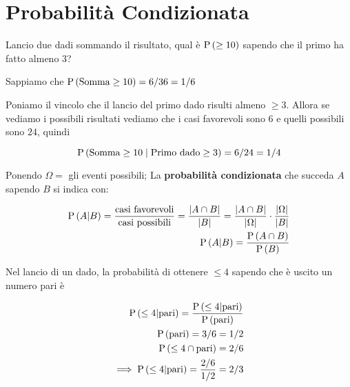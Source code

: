 \section{Probabilit\`a Condizionata}

\begin{exmp}
    Lancio due dadi sommando il risultato, qual \`e $ \text{P}\left(\geq 10\right) $ sapendo che il primo ha fatto almeno 3?

    Sappiamo che $ \text{P}\left(\text{Somma} \geq 10\right) = 6/36 = 1/6 $
    
	Poniamo il vincolo che il lancio del primo dado risulti almeno $ \geq 3 $. Allora se vediamo i possibili
    risultati vediamo che i casi favorevoli sono $6$ e quelli possibili sono $24$, quindi

    \begin{equation*}
    \text{P}\left(\text{Somma} \geq 10 \mid \text{Primo dado} \geq 3\right) = 6/24 = 1/4
    \end{equation*}
\end{exmp}



\begin{defn}
    
    Ponendo $ \Omega = $ gli eventi possibili;
    La \textbf{probabilit\`a condizionata} che succeda $ A $ sapendo $ B $ si indica con:
    
    \begin{equation}
    \begin{aligned}
    \text{P}\left(A|B\right) = \dfrac{\text{casi favorevoli}}{\text{casi possibili}} = \dfrac{\lvert A \cap B\rvert}{\lvert B\rvert} = \dfrac{\lvert A \cap B\rvert}{\lvert\Omega\rvert} \cdot \dfrac{\lvert\Omega\rvert}{\lvert B\rvert} \\
    \text{P}\left(A|B\right) = \dfrac{\text{P}\left(A \cap B\right)}{\text{P}\left(B\right)}	
    \end{aligned}
    \end{equation}
    
\end{defn}

\begin{exmp}
    Nel lancio di un dado, la probabilit\`a di ottenere $ \leq 4 $ sapendo che \`e uscito un numero pari \`e
    
    \begin{equation*}
    \begin{aligned}
    \text{P}\left(\leq 4|\text{pari}\right) = \dfrac{\text{P}\left(\leq 4 | \text{pari}\right)}{\text{P}\left(\text{pari}\right)} \\
    \text{P}\left(\text{pari}\right) = 3/6 = 1/2 \\
    \text{P}\left(\leq 4 \cap \text{pari}\right) = 2/6 \\
    \implies \text{P}\left(\leq 4|\text{pari}\right) = \dfrac{2/6}{1/2} = 2/3
    \end{aligned}
    \end{equation*}
\end{exmp}

